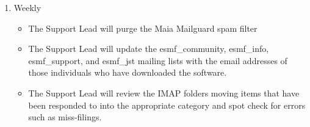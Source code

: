 \begin{enumerate}
\item Weekly
  \begin{itemize}
  \item The Support Lead will purge the Maia Mailguard spam filter
  \item The Support Lead will update the esmf\_community, esmf\_info, esmf\_support, and esmf\_jst mailing lists with the email addresses of those individuals who have downloaded the software.
  \item The Support Lead will review the IMAP folders moving items that have been responded to into the appropriate category and spot check for errors such as miss-filings.
  \end{itemize}

\end{enumerate}  
 
